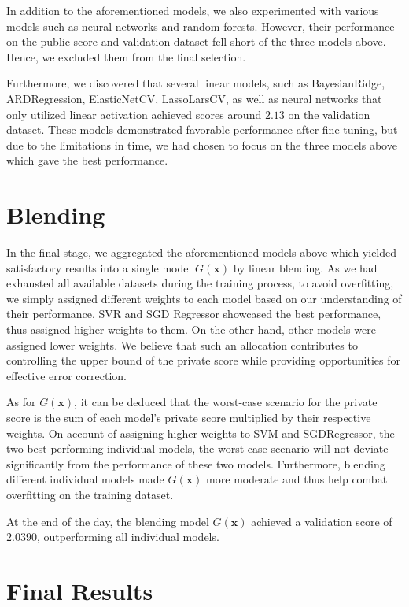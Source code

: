 \documentclass[10pt,letterpaper]{article}
\begin{document}
In addition to the aforementioned models, we also experimented with various models such as neural networks and random forests. However, their performance on the public score and validation dataset fell short of the three models above. Hence, we excluded them from the final selection.

Furthermore, we discovered that several linear models, such as BayesianRidge, ARDRegression, ElasticNetCV, LassoLarsCV, as well as neural networks that only utilized linear activation achieved scores around $2.13$ on the validation dataset. These models demonstrated favorable performance after fine-tuning, but due to the limitations in time, we had chosen to focus on the three models above which gave the best performance. 

\section{Blending}

In the final stage, we aggregated the aforementioned models above which yielded satisfactory results into a single model $G(\mathbf{x})$ by linear blending. As we had exhausted all available datasets during the training process, to avoid overfitting, we simply assigned different weights to each model based on our understanding of their performance. SVR and SGD Regressor showcased the best performance, thus assigned higher weights to them. On the other hand, other models were assigned lower weights. We believe that such an allocation contributes to controlling the upper bound of the private score while providing opportunities for effective error correction. 

As for $G(\mathbf{x})$, it can be deduced that the worst-case scenario for the private score is the sum of each model's private score multiplied by their respective weights. On account of assigning higher weights to SVM and SGDRegressor, the two best-performing individual models, the worst-case scenario will not deviate significantly from the performance of these two models. Furthermore, blending different individual models made $G(\mathbf{x})$ more moderate and thus help combat overfitting on the training dataset. 

At the end of the day, the blending model $G(\mathbf{x})$ achieved a validation score of $2.0390$, outperforming all individual models.

\section{Final Results}
\end{document}
